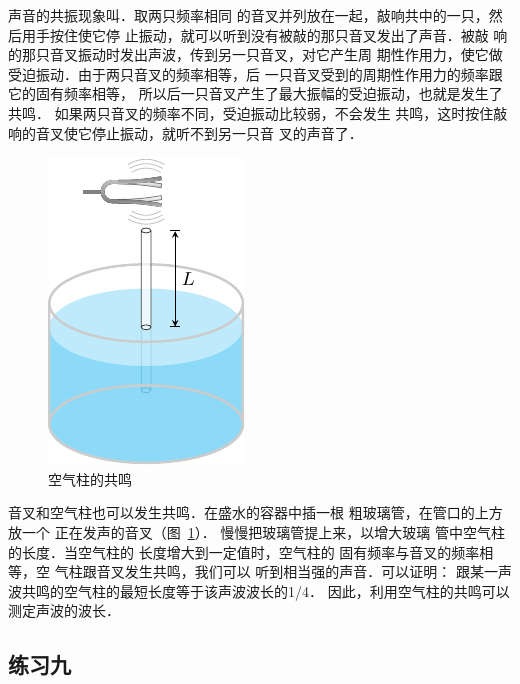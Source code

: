 声音的共振现象叫．取两只频率相同
的音叉并列放在一起，敲响共中的一只，然后用手按住使它停
止振动，就可以听到没有被敲的那只音叉发出了声音．被敲
响的那只音叉振动时发出声波，传到另一只音叉，对它产生周
期性作用力，使它做受迫振动．由于两只音叉的频率相等，后
一只音叉受到的周期性作用力的频率跟它的固有频率相等，
所以后一只音叉产生了最大振幅的受迫振动，也就是发生了
共鸣．
如果两只音叉的频率不同，受迫振动比较弱，不会发生
共鸣，这时按住敲响的音叉使它停止振动，就听不到另一只音
叉的声音了．
\begin{figure}[htbp]
    \centering
    \includegraphics{fig/A/9-29.pdf}
    \caption{空气柱的共鸣}\label{fig_A_9-29}
\end{figure}

音叉和空气柱也可以发生共鸣．在盛水的容器中插一根
粗玻璃管，在管口的上方放一个
正在发声的音叉（图~\ref{fig_A_9-29}）．
慢慢把玻璃管提上来，以增大玻璃
管中空气柱的长度．当空气柱的
长度增大到一定值时，空气柱的
固有频率与音叉的频率相等，空
气柱跟音叉发生共鸣，我们可以
听到相当强的声音．可以证明：
跟某一声波共鸣的空气柱的最短长度等于该声波波长的1/4．
因此，利用空气柱的共鸣可以测定声波的波长．


\subsection*{练习九}

